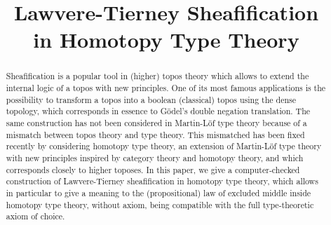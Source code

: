 \documentclass[conference]{IEEEtran}
\begin{document}
%
\title{Lawvere-Tierney Sheafification\\ in Homotopy Type Theory}


\author{
}



\maketitle

\begin{abstract}

  Sheafification is a popular tool in (higher) topos theory which
  allows to extend the internal logic of a topos with new
  principles. One of its most famous applications is the possibility
  to transform a topos into a boolean (classical) topos using the
  dense topology, which corresponds in essence to Gödel's double
  negation translation.
  The same construction has not been considered in Martin-Löf type
  theory because of a mismatch between topos theory and type theory. This
  mismatched has been fixed recently by considering homotopy type
  theory, an extension of Martin-Löf type theory with new
  principles inspired by category theory and homotopy theory, and
  which corresponds closely to higher toposes.
  In this paper, we give a computer-checked construction of
  Lawvere-Tierney sheafification in homotopy type theory, which allows
  in particular to give a meaning to the (propositional) law of
  excluded middle inside homotopy type theory, without axiom, being
  compatible with the full type-theoretic axiom of choice.
  
\end{abstract}
\end{document}
